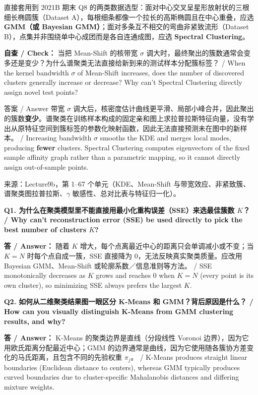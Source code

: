 直接套用到 2021B 期末 Q8 的两类数据选型：面对中心交叉呈星形放射状的三根细长椭圆簇（Dataset A），每根细条都像一个拉长的高斯椭圆且在中心重叠，应选 \textbf{GMM（或 Bayesian GMM）}；面对多条互不相交的弯曲非紧致流形（Dataset B），点集并非围绕单中心成团而是各自连通成图，应选 \textbf{Spectral Clustering}。

\textbf{自查 / Check：} 当把 Mean-Shift 的核带宽 $\sigma$ 调大时，最终聚出的簇数通常会变多还是变少？为什么谱聚类无法直接给新到来的测试样本分配簇标签？ / When the kernel bandwidth $\sigma$ of Mean-Shift increases, does the number of discovered clusters generally increase or decrease? Why can't Spectral Clustering directly assign novel test points?

\begin{StudySolution}{答案 / Answer}
带宽 $\sigma$ 调大后，核密度估计曲线更平滑、局部小峰合并，因此聚出的簇数\textbf{变少}。谱聚类在训练样本构成的固定亲和图上求拉普拉斯特征向量，没有学出从原特征空间到簇标签的参数化映射函数，因此无法直接预测未在图中的新样本。 / Increasing bandwidth $\sigma$ smooths the KDE and merges local modes, producing \textbf{fewer} clusters. Spectral Clustering computes eigenvectors of the fixed sample affinity graph rather than a parametric mapping, so it cannot directly assign out-of-sample points.
\end{StudySolution}

来源：Lecture9b，第 1–67 个单元（KDE、Mean-Shift 与带宽效应、非紧致簇、谱聚类图拉普拉斯、$\gamma$ 敏感性、总对比表与特征归一化）。



\textbf{Q1. 为什么在聚类模型里不能直接用最小化重构误差（SSE）来选最佳簇数 $K$？ / Why can't reconstruction error (SSE) be used directly to pick the best number of clusters $K$?}

\textbf{答 / Answer：} 随着 $K$ 增大，每个点离最近中心的距离只会单调减小或不变；当 $K=N$ 时每个点自成一簇，SSE 直接降为 0，无法反映真实聚类质量。应改用 Bayesian GMM、Mean-Shift 或轮廓系数／信息准则等方法。 / SSE monotonically decreases as $K$ grows and reaches 0 when $K=N$ (every point is its own cluster), so minimizing SSE always prefers the largest $K$.

\textbf{Q2. 如何从二维聚类结果图一眼区分 K-Means 和 GMM？背后原因是什么？ / How can you visually distinguish K-Means from GMM clustering results, and why?}

\textbf{答 / Answer：} K-Means 的聚类边界是直线（分段线性 Voronoi 边界），因为它用欧氏距离分配最近中心；GMM 的边界通常是曲线，因为它使用随各簇协方差变化的马氏距离，且包含不同的先验权重 $\pi_j$。 / K-Means produces straight linear boundaries (Euclidean distance to centers), whereas GMM typically produces curved boundaries due to cluster-specific Mahalanobis distances and differing mixture weights.


